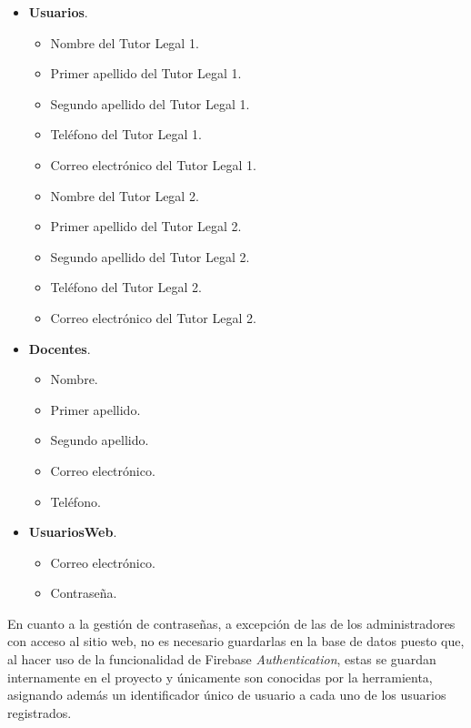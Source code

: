 \begin{itemize}
	\item \textbf{Usuarios}.
		\begin{itemize}
			\item Nombre del Tutor Legal 1.
			\item Primer apellido del Tutor Legal 1.
			\item Segundo apellido del Tutor Legal 1.
			\item Teléfono del Tutor Legal 1.
			\item Correo electrónico del Tutor Legal 1.
			\item Nombre del Tutor Legal 2.
			\item Primer apellido del Tutor Legal 2.
			\item Segundo apellido del Tutor Legal 2.
			\item Teléfono del Tutor Legal 2.
			\item Correo electrónico del Tutor Legal 2.
		\end{itemize}
		
	\item \textbf{Docentes}.
		\begin{itemize}
			\item Nombre.
			\item Primer apellido.
			\item Segundo apellido.
			\item Correo electrónico.
			\item Teléfono.
		\end{itemize}
		
	\item \textbf{UsuariosWeb}.
		\begin{itemize}
			\item Correo electrónico.
			\item Contraseña.
		\end{itemize}
		
\end{itemize}

\clearpage

En cuanto a la gestión de contraseñas, a excepción de las de los administradores con acceso al sitio web, no es necesario guardarlas en la base de datos  puesto que, al hacer uso de la funcionalidad de Firebase \textit{Authentication}, estas se guardan internamente en el proyecto y únicamente son conocidas por la herramienta, asignando además un identificador único de usuario a cada uno de los usuarios registrados.

